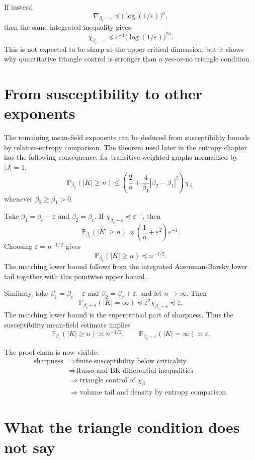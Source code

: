 \documentclass[11pt,reqno]{book}
\numberwithin{equation}{chapter}
\theoremstyle{plain}
\theoremstyle{definition}
\theoremstyle{remark}
\renewcommand{\P}{\mathbb P}
\newcommand{\eps}{\varepsilon}
\newcommand{\1}{\mathbf 1}
\newcommand{\as}{\asymp}
\newcommand{\pre}{\preceq}
\begin{document}
If instead
\[
  \nabla_{\beta_c-\eps}\pre \bigl(\log(1/\eps)\bigr)^a,
\]
then the same integrated inequality gives
\[
  \chi_{\beta_c-\eps}
  \pre
  \eps^{-1}\bigl(\log(1/\eps)\bigr)^{2a}.
\]
This is not expected to be sharp at the upper critical dimension, but it shows why quantitative triangle control is stronger than a yes-or-no triangle condition.

\section{From susceptibility to other exponents}

The remaining mean-field exponents can be deduced from susceptibility bounds by relative-entropy comparison. The theorem used later in the entropy chapter has the following consequence: for transitive weighted graphs normalized by $|J|=1$,
\[
  \P_{\beta_2}(|K|\geq n)
  \leq
  \left(
  \frac2n+\frac4{\beta_1}|\beta_2-\beta_1|^2
  \right)\chi_{\beta_1}
\]
whenever $\beta_2\geq\beta_1>0$.

Take $\beta_1=\beta_c-\eps$ and $\beta_2=\beta_c$. If $\chi_{\beta_c-\eps}\pre \eps^{-1}$, then
\[
  \P_{\beta_c}(|K|\geq n)
  \pre
  \left(\frac1n+\eps^2\right)\eps^{-1}.
\]
Choosing $\eps=n^{-1/2}$ gives
\[
  \P_{\beta_c}(|K|\geq n)\pre n^{-1/2}.
\]
The matching lower bound follows from the integrated Aizenman-Barsky lower tail together with this pointwise upper bound.

Similarly, take $\beta_1=\beta_c-\eps$ and $\beta_2=\beta_c+\eps$, and let $n\to\infty$. Then
\[
  \P_{\beta_c+\eps}(|K|=\infty)
  \pre
  \eps^2\chi_{\beta_c-\eps}
  \pre
  \eps.
\]
The matching lower bound is the supercritical part of sharpness. Thus the susceptibility mean-field estimate implies
\[
  \P_{\beta_c}(|K|\geq n)\as n^{-1/2},
  \qquad
  \P_{\beta_c+\eps}(|K|=\infty)\as \eps.
\]

The proof chain is now visible:
\[
\begin{aligned}
\text{sharpness}
&\Longrightarrow
\text{finite susceptibility below criticality}\\
&\Longrightarrow
\text{Russo and BK differential inequalities}\\
&\Longrightarrow
\text{triangle control of }\chi_\beta\\
&\Longrightarrow
\text{volume tail and density by entropy comparison}.
\end{aligned}
\]

\section{What the triangle condition does not say}
\end{document}
